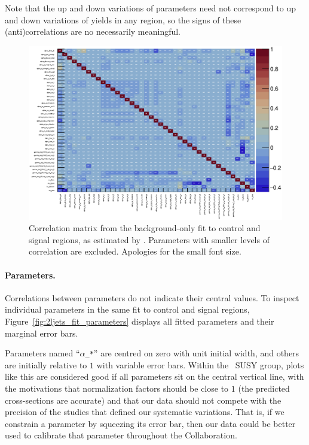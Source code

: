 Note that the up and down variations of parameters need not correspond to up
and down variations of yields in any region, so the signs of these
(anti)correlations are no necessarily meaningful.

\begin{figure}[tp]
\centering
\includegraphics[width=\textwidth]{figures/2ljets_fit_corrmatrix.pdf}
\caption[
Correlation matrix from the background-only fit to control and signal regions
]{%
Correlation matrix from the background-only fit to control and signal regions,
as estimated by \histfitter.
Parameters with smaller levels of correlation are excluded.
Apologies for the small font size.
}
\label{fig:2ljets_fit_corrmatrix}
\end{figure}

\paragraph{Parameters.}
Correlations between parameters do not indicate their central values.
To inspect individual parameters in the same fit to control and signal regions,
Figure~\ref{fig:2ljets_fit_parameters} displays all fitted parameters and their
marginal error bars.

Parameters named ``\texttt{$\alpha$\_*}'' are centred on zero with unit initial width,
and others are initially relative to $1$ with variable error bars.
Within the \atlas\ SUSY group, plots like this are considered good if all
parameters sit on the central vertical line, with the motivations that
normalization factors should be close to $1$ (the predicted cross-sections are
accurate) and that our data should not compete with the precision of the
studies that defined our systematic variations.
That is, if we constrain a parameter by squeezing its error bar, then our data
could be better used to calibrate that parameter throughout the Collaboration.

